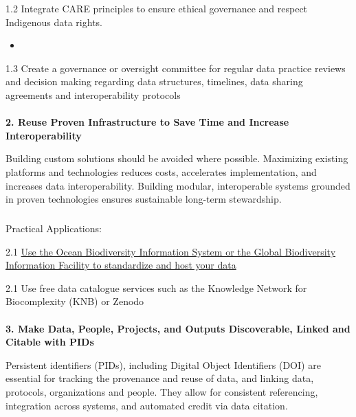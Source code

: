\documentclass[
  letterpaper,
  DIV=11,
  numbers=noendperiod]{scrartcl}
\makeatletter
\let\oldparagraph\paragraph
\renewcommand{\paragraph}{
    \@ifstar
      \xxxParagraphStar
      \xxxParagraphNoStar
  }
\newcommand{\xxxParagraphStar}[1]{\oldparagraph*{#1}\mbox{}}
\newcommand{\xxxParagraphNoStar}[1]{\oldparagraph{#1}\mbox{}}
\let\oldsubparagraph\subparagraph
\renewcommand{\subparagraph}{
    \@ifstar
      \xxxSubParagraphStar
      \xxxSubParagraphNoStar
  }
\newcommand{\xxxSubParagraphStar}[1]{\oldsubparagraph*{#1}\mbox{}}
\newcommand{\xxxSubParagraphNoStar}[1]{\oldsubparagraph{#1}\mbox{}}
\providecommand{\tightlist}{%
  \setlength{\itemsep}{0pt}\setlength{\parskip}{0pt}}\usepackage{longtable,booktabs,array}
\makeatother
\begin{document}
1.2 Integrate CARE principles to ensure ethical governance and respect
Indigenous data rights.

\begin{itemize}
\tightlist
\item
\end{itemize}

1.3 Create a governance or oversight committee for regular data practice
reviews and decision making regarding data structures, timelines, data
sharing agreements and interoperability protocols

\paragraph{\texorpdfstring{\textbf{2. Reuse Proven Infrastructure to
Save Time and Increase
Interoperability}}{2. Reuse Proven Infrastructure to Save Time and Increase Interoperability}}\label{reuse-proven-infrastructure-to-save-time-and-increase-interoperability}

Building custom solutions should be avoided where possible. Maximizing
existing platforms and technologies reduces costs, accelerates
implementation, and increases data interoperability. Building modular,
interoperable systems grounded in proven technologies ensures
sustainable long-term stewardship.

\subparagraph{Practical Applications:}\label{practical-applications-1}

2.1 \href{https://doi.org/10.14286/duc6mu}{Use the Ocean Biodiversity
Information System or the Global Biodiversity Information Facility to
standardize and host your data}

2.1 Use free data catalogue services such as the Knowledge Network for
Biocomplexity (KNB) or Zenodo

\paragraph{\texorpdfstring{\textbf{3. Make Data, People, Projects, and
Outputs Discoverable, Linked and Citable with
PIDs}}{3. Make Data, People, Projects, and Outputs Discoverable, Linked and Citable with PIDs}}\label{make-data-people-projects-and-outputs-discoverable-linked-and-citable-with-pids}

Persistent identifiers (PIDs), including Digital Object Identifiers
(DOI) are essential for tracking the provenance and reuse of data, and
linking data, protocols, organizations and people. They allow for
consistent referencing, integration across systems, and automated credit
via data citation.
\end{document}
